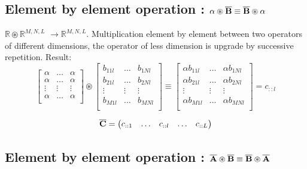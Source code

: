\documentclass[11pt]{article}
\newcommand{\TRIX}[1]{\mathbf{\overline{\uppercase{#1}}}}
\newcommand{\mulebe}{\circledast}
\newcommand{\dimsep}{,}
\begin{document}
\subsection{Element by element operation : $\alpha \mulebe  \TRIX{B}\equiv \TRIX{B}\mulebe \alpha$}

 $\mathbb{R}\mulebe \mathbb{R}^{M\dimsep N \dimsep L}$ $\rightarrow \mathbb{R}^{M\dimsep N \dimsep L}$.
 Multiplication element by element 
  between two operators of different dimensions, the operator of less dimension is upgrade by 
  successive repetition. Result: 
\begin{equation}
  \left[
 \begin{matrix}
 \alpha &\hdots &\alpha\\ 
 \alpha &\hdots &\alpha\\
 \vdots &\vdots &\vdots\\ 
 \alpha &\hdots &\alpha\\ 
 \end{matrix}
 \right]\mulebe 
   \left[
 \begin{matrix}
 b_{11l} &\hdots &b_{1Nl}\\ 
 b_{21l} &\hdots &b_{2Nl}\\
 \vdots &\vdots &\vdots\\ 
 b_{M1l} &\hdots &b_{MNl}\\ 
 \end{matrix}
 \right]
 \equiv \left[
 \begin{matrix}
 \alpha b_{11l} &\hdots &\alpha b_{1Nl}\\ 
 \alpha b_{21l} &\hdots &\alpha b_{2Nl}\\
 \vdots &\vdots &\vdots\\ 
 \alpha b_{M1l} &\hdots &\alpha b_{MNl}\\ 
 \end{matrix}
 \right]=c_{::l}
 \end{equation}

 \begin{equation}
\TRIX{C}=\left(
 \begin{matrix}
 c_{::1}&\hdots&c_{::l}&\hdots&c_{::L}\\
 \end{matrix}
 \right)
\end{equation}


\subsection{Element by element operation : $\TRIX{A} \mulebe  \TRIX{B}\equiv \TRIX{B}\mulebe \TRIX{A}$}
\end{document}
